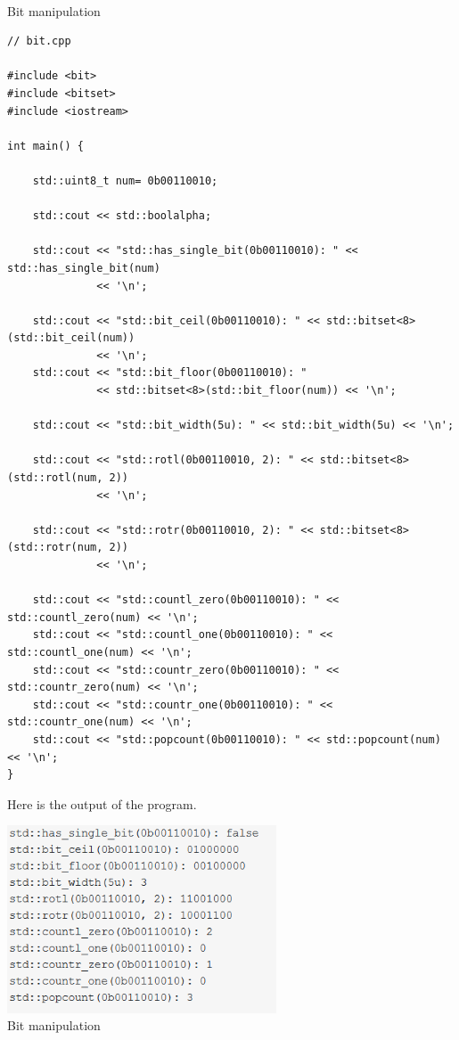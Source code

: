 \hspace*{\fill} \\ %
\noindent
Bit manipulation
\begin{lstlisting}[style=styleCXX]
// bit.cpp

#include <bit>
#include <bitset>
#include <iostream>

int main() {
	
	std::uint8_t num= 0b00110010;
	
	std::cout << std::boolalpha;
	
	std::cout << "std::has_single_bit(0b00110010): " << std::has_single_bit(num)
	          << '\n';
	          
	std::cout << "std::bit_ceil(0b00110010): " << std::bitset<8>(std::bit_ceil(num))
	          << '\n';          
	std::cout << "std::bit_floor(0b00110010): "
	          << std::bitset<8>(std::bit_floor(num)) << '\n';
	
	std::cout << "std::bit_width(5u): " << std::bit_width(5u) << '\n';
	
	std::cout << "std::rotl(0b00110010, 2): " << std::bitset<8>(std::rotl(num, 2))
	          << '\n';
	
	std::cout << "std::rotr(0b00110010, 2): " << std::bitset<8>(std::rotr(num, 2))
	          << '\n';
	          
	std::cout << "std::countl_zero(0b00110010): " << std::countl_zero(num) << '\n';
	std::cout << "std::countl_one(0b00110010): " << std::countl_one(num) << '\n';
	std::cout << "std::countr_zero(0b00110010): " << std::countr_zero(num) << '\n';
	std::cout << "std::countr_one(0b00110010): " << std::countr_one(num) << '\n';
	std::cout << "std::popcount(0b00110010): " << std::popcount(num) << '\n';
}
\end{lstlisting}

Here is the output of the program.

\begin{center}
\includegraphics[width=0.6\textwidth]{content/3/chapter5/images/1-6.png}\\
Bit manipulation
\end{center}

